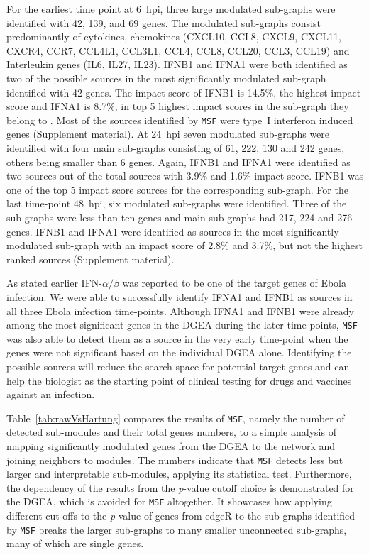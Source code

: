 \documentclass[10pt,a4paper,twocolumn]{article}
\newcommand{\DONE}[1]{\begingroup\color{blue}#1\endgroup}
\begin{document}
	For the earliest time point at 6~hpi, three large modulated
        sub-graphs were identified with 42, 139, and 69 genes.  The
        modulated sub-graphs consist predominantly of cytokines,
        chemokines (CXCL10, CCL8, CXCL9, CXCL11, CXCR4, CCR7, CCL4L1,
        CCL3L1, CCL4, CCL8, CCL20, CCL3, CCL19) and Interleukin genes
        (IL6, IL27, IL23).  IFNB1 and IFNA1 were both identified as
        two of the possible sources in the most significantly
        modulated sub-graph identified with 42 genes. The impact score
        of IFNB1 is 14.5\%, \DONE{the highest impact score and IFNA1 is 8.7\%, in top 5 highest impact scores in the sub-graph they
        	belong to} . Most of the sources identified by \texttt{MSF}
        were type~I interferon induced genes (Supplement material).
        At 24~hpi seven modulated sub-graphs were identified with four
        main sub-graphs consisting of 61, 222, 130 and 242 genes,
        others being smaller than 6 genes. Again, IFNB1 and IFNA1 were
        identified as two sources out of the total sources with 3.9\% 
        and 1.6\% impact score. \DONE{IFNB1 was one of the top 5 impact score sources for the corresponding sub-graph}. For the last time-point 48~hpi, six
        modulated sub-graphs were identified. Three of the sub-graphs
        were less than ten genes and main sub-graphs had 217, 224 and
        276 genes. IFNB1 and IFNA1 were identified as sources in the
        most significantly modulated sub-graph with an impact score of
        2.8\% and 3.7\%, \DONE{but not the highest ranked sources} (Supplement material). 
	
	As stated earlier IFN-$\alpha / \beta$ was reported to be one
        of the target genes of Ebola infection. We were able to
        successfully identify IFNA1 and IFNB1 as sources in all three
        Ebola infection time-points. Although IFNA1 and IFNB1 were
        already among the most significant genes in the DGEA during
        the later time points, \texttt{MSF} was also able to detect
        them as a source in the very early time-point when the genes
        were not significant based on the individual DGEA
        alone. Identifying the possible sources will reduce the search
        space for potential target genes and can help the biologist as
        the starting point of clinical testing for drugs and vaccines
        against an infection.
	
	Table~\ref{tab:rawVsHartung} compares the results of
        \texttt{MSF}, namely the number of detected sub-modules and
        their total genes numbers, to a simple analysis of mapping
        significantly modulated genes from the DGEA to the network and
        joining neighbors to modules. The numbers indicate that
        \texttt{MSF} detects less but larger and interpretable
        sub-modules, applying its statistical test. Furthermore, the
        dependency of the results from the \textit{p}-value cutoff
        choice is demonstrated for the DGEA, which is avoided for
        \texttt{MSF} altogether. It showcases how applying different
        cut-offs to the \textit{p}-value of genes from edgeR to the
        sub-graphs identified by \texttt{MSF} breaks the larger
        sub-graphs to many smaller unconnected sub-graphs, many of
        which are single genes.
	
\end{document}
